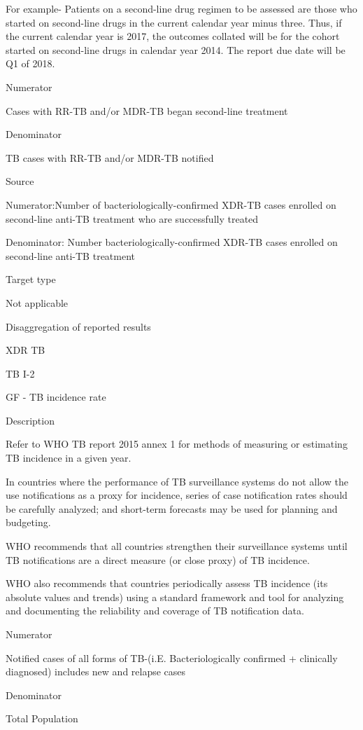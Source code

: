\documentclass[]{book}
\begin{document}
For example- Patients on a second-line drug regimen to be assessed are those who started on second-line drugs in the current calendar year minus three. Thus, if the current calendar year is 2017, the outcomes collated will be for the cohort started on second-line drugs in calendar year 2014. The report due date will be Q1 of 2018.

Numerator

Cases with RR-TB and/or MDR-TB began second-line treatment

Denominator

TB cases with RR-TB and/or MDR-TB notified

Source

Numerator:Number of bacteriologically-confirmed XDR-TB cases enrolled on second-line anti-TB treatment who are successfully treated

Denominator: Number bacteriologically-confirmed XDR-TB cases enrolled on second-line anti-TB treatment

Target type

Not applicable

Disaggregation of reported results

XDR TB

TB I-2

GF - TB incidence rate

Description

Refer to WHO TB report 2015 annex 1 for methods of measuring or estimating TB incidence in a given year.

In countries where the performance of TB surveillance systems do not allow the use notifications as a proxy for incidence, series of case notification rates should be carefully analyzed; and short-term forecasts may be used for planning and budgeting.

WHO recommends that all countries strengthen their surveillance systems until TB notifications are a direct measure (or close proxy) of TB incidence.

WHO also recommends that countries periodically assess TB incidence (its absolute values and trends) using a standard framework and tool for analyzing and documenting the reliability and coverage of TB notification data.

Numerator

Notified cases of all forms of TB-(i.E. Bacteriologically confirmed + clinically diagnosed) includes new and relapse cases

Denominator

Total Population
\end{document}

